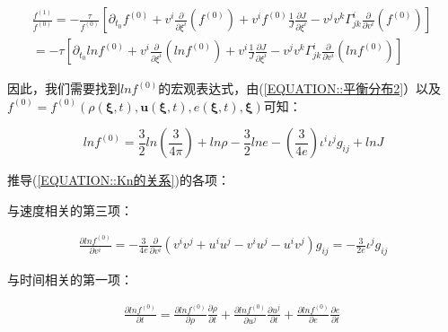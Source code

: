 \documentclass[MathematicsNumericsDerivationsAndOpenFOAM.tex]{subfiles}
\begin{document}
\begin{equation}
  \begin{gathered}
    \frac{f^{(1)}}{f^{(0)}}=-\frac{\tau}{f^{(0)}}\left[\partial_{t_{0}} f^{(0)}+v^{i}\frac{\partial}{\partial \xi^{i}}\left( f^{(0)}\right)+v^i f^{(0)}\frac{1}{J} \frac{\partial J}{\partial \xi^i}-v^{j} v^{k} \Gamma_{j k}^{i} \frac{\partial}{\partial v^{i}}\left(  f^{(0)}\right)\right] \\
    = -\tau \left[\partial_{t_{0}} ln f^{(0)}+v^{i}\frac{\partial}{\partial \xi^{i}}\left( ln f^{(0)}\right)+v^i \frac{1}{J} \frac{\partial J}{\partial \xi^i} -v^{j} v^{k} \Gamma_{j k}^{i} \frac{\partial}{\partial v^{i}}\left(  ln f^{(0)}\right)\right]
  \end{gathered}
  \label{EQUATION::Kn的关系} ~
\end{equation}


因此，我们需要找到$ln f^{(0)}$的宏观表达式，由(\ref{EQUATION::平衡分布2}）以及$f^{(0)}=f^{(0)}(\rho(\boldsymbol{\xi},t),\boldsymbol{u}(\boldsymbol{\xi},t),e(\boldsymbol{\xi},t),\boldsymbol{\xi})$可知：


\begin{equation}
  ln f^{(0)} = \frac{3}{2} ln(\frac{3}{4\pi}) + ln \rho - \frac{3}{2} ln e - (\frac{3}{4e}){\iota^i\iota^jg_{ij}}+ln J
\end{equation}


推导(\ref{EQUATION::Kn的关系})的各项：

与速度相关的第三项：

\begin{equation}
  \begin{gathered}
    \frac{\partial ln f^{(0)}}{\partial v^i} =
    -\frac{3}{4e} \frac{\partial}{\partial v^i}(v^iv^j+u^iu^j-v^iu^j-u^iv^j)g_{ij}=-\frac{3}{2e}\iota^j g_{ij}
  \end{gathered}
\end{equation}

与时间相关的第一项：

\begin{equation}
  \begin{gathered}
    \frac{\partial ln f^{(0)}}{\partial t} =
    \frac{\partial ln f^{(0)}}{\partial \rho} \frac{\partial \rho}{\partial t} +     \frac{\partial ln f^{(0)}}{\partial u^j} \frac{\partial u^j}{\partial t} +     \frac{\partial ln f^{(0)}}{\partial e} \frac{\partial e}{\partial t}
  \end{gathered}
  \label{EQUATION::推导lnt} ~
\end{equation}
\end{document}

